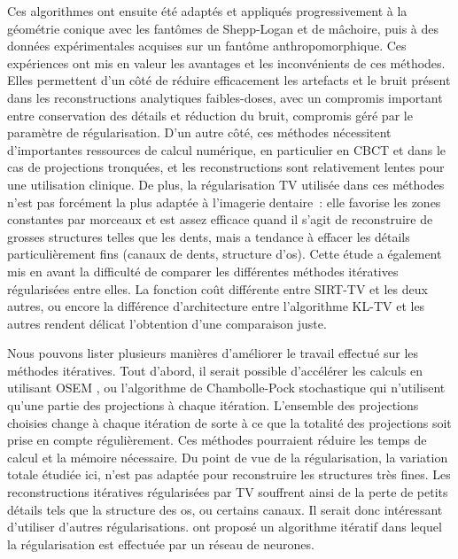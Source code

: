 Ces algorithmes ont ensuite été adaptés et appliqués progressivement à la géométrie conique avec les fantômes de Shepp-Logan et de mâchoire, puis à des données expérimentales acquises sur un fantôme anthropomorphique. Ces expériences ont mis en valeur les avantages et les inconvénients de ces méthodes. Elles permettent d'un côté de réduire efficacement les artefacts et le bruit présent dans les reconstructions analytiques faibles-doses, avec un compromis important entre conservation des détails et réduction du bruit, compromis géré par le paramètre de régularisation. D'un autre côté, ces méthodes nécessitent d'importantes ressources de calcul numérique, en particulier en CBCT et dans le cas de projections tronquées, et les reconstructions sont relativement lentes pour une utilisation clinique. De plus, la régularisation TV utilisée dans ces méthodes n'est pas forcément la plus adaptée à l'imagerie dentaire~: elle favorise les zones constantes par morceaux et est assez efficace quand il s'agit de reconstruire de grosses structures telles que les dents, mais a tendance à effacer les détails particulièrement fins (canaux de dents, structure d'os). Cette étude a également mis en avant la difficulté de comparer les différentes méthodes itératives régularisées entre elles. La fonction coût différente entre SIRT-TV et les deux autres, ou encore la différence d'architecture entre l'algorithme KL-TV et les autres rendent délicat l'obtention d'une comparaison juste. 

Nous pouvons lister plusieurs manières d'améliorer le travail effectué sur les méthodes itératives. Tout d'abord, il serait possible d'accélérer les calculs en utilisant OSEM , ou l'algorithme de Chambolle-Pock stochastique  qui n'utilisent qu'une partie des projections à chaque itération. L'ensemble des projections choisies change à chaque itération de sorte à ce que la totalité des projections soit prise en compte régulièrement. Ces méthodes pourraient réduire les temps de calcul et la mémoire nécessaire. Du point de vue de la régularisation, la variation totale étudiée ici, n'est pas adaptée pour reconstruire les structures très fines. Les reconstructions itératives régularisées par TV souffrent ainsi de la perte de petits détails tels que la structure des os, ou certains canaux. Il serait donc intéressant d'utiliser d'autres régularisations. \cite{Ye2018} ont proposé un algorithme itératif dans lequel la régularisation est effectuée par un réseau de neurones.  

